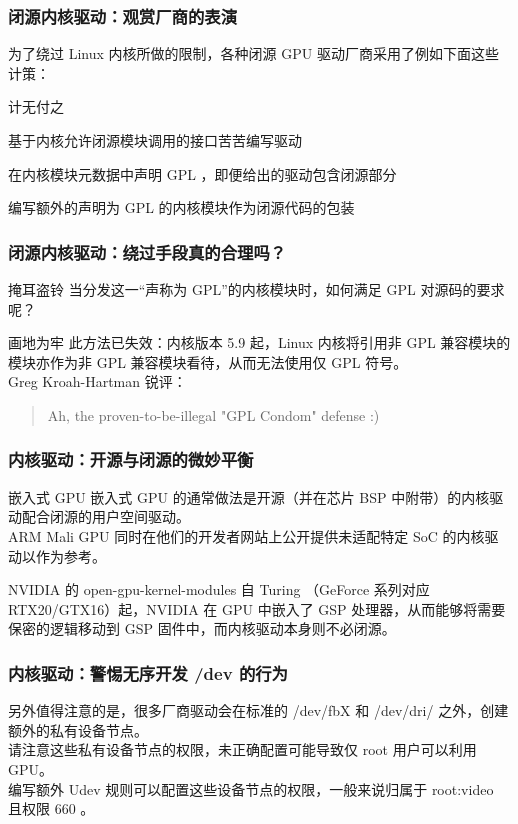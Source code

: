 \documentclass{ctexbeamer}
\begin{document}
\begin{frame}
    \frametitle{闭源内核驱动：观赏厂商的表演}
    为了绕过 Linux 内核所做的限制，各种闭源 GPU 驱动厂商采用了例如下面这些计策：\\
    \begin{labeling}{计无付之}
        \item [计无付之] 基于内核允许闭源模块调用的接口苦苦编写驱动
        \item [掩耳盗铃] 在内核模块元数据中声明 GPL ，即便给出的驱动包含闭源部分
        \item [画地为牢] 编写额外的声明为 GPL 的内核模块作为闭源代码的包装
    \end{labeling}
\end{frame}

\begin{frame}
    \frametitle{闭源内核驱动：绕过手段真的合理吗？}
    \begin{block}{掩耳盗铃}
        当分发这一“声称为 GPL”的内核模块时，如何满足 GPL 对源码的要求呢？
    \end{block}
    \begin{block}{画地为牢}
        此方法已失效：内核版本 5.9 起，Linux 内核将引用非 GPL 兼容模块的模块亦作为非 GPL 兼容模块看待，从而无法使用仅 GPL 符号。\\
        Greg Kroah-Hartman 锐评：
        \begin{quote}
            Ah, the proven-to-be-illegal "GPL Condom" defense :)
        \end{quote}
    \end{block}
\end{frame}

\begin{frame}
    \frametitle{内核驱动：开源与闭源的微妙平衡}
    \begin{block}{嵌入式 GPU}
        嵌入式 GPU 的通常做法是开源（并在芯片 BSP 中附带）的内核驱动配合闭源的用户空间驱动。\\
        ARM Mali GPU 同时在他们的开发者网站上公开提供未适配特定 SoC 的内核驱动以作为参考。
    \end{block}
    \begin{block}{NVIDIA 的 open-gpu-kernel-modules}
        自 Turing （GeForce 系列对应 RTX20/GTX16）起，NVIDIA 在 GPU 中嵌入了 GSP 处理器，从而能够将需要保密的逻辑移动到 GSP 固件中，而内核驱动本身则不必闭源。
    \end{block}
\end{frame}

\begin{frame}
    \frametitle{内核驱动：警惕无序开发 /dev 的行为}
    另外值得注意的是，很多厂商驱动会在标准的 /dev/fbX 和 /dev/dri/ 之外，创建额外的私有设备节点。\\
    请注意这些私有设备节点的权限，未正确配置可能导致仅 root 用户可以利用 GPU。\\
    编写额外 Udev 规则可以配置这些设备节点的权限，一般来说归属于 root:video 且权限 660 。
\end{frame}
\end{document}

